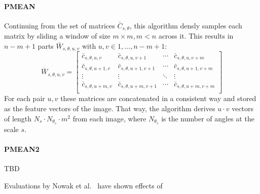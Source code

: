 \paragraph{PMEAN}

Continuing from the set of matrices $\bar{C}_{s, \theta}$, this algorithm
densly samples each matrix by sliding a window of size $m \times m, m < n$
across it. This results in $n - m + 1$ parts $\bar{W}_{s, \theta, u, v}$ with
$u, v \in 1, \dots, n - m + 1$:
\begin{equation*}
    \bar{W}_{s,\theta,u,v} =
    \begin{bmatrix}
        \bar{c}_{s,\theta,u,v} & \bar{c}_{s,\theta,u,v+1} & \cdots & \bar{c}_{s,\theta,u,v+m} \\
        \bar{c}_{s,\theta,u+1,v} & \bar{c}_{s,\theta,u+1,v+1} & \cdots & \bar{c}_{s,\theta,u+1,v+m} \\
        \vdots  & \vdots  & \ddots & \vdots  \\
        \bar{c}_{s,\theta,u+m,v} & \bar{c}_{s,\theta,u+m,v+1} & \cdots & \bar{c}_{s,\theta,u+m,v+m} \\
    \end{bmatrix}
\end{equation*}
For each pair $u, v$ these matrices are concatenated in a consistent way and
stored as the feature vectors of the image. That way, the algorithm derives $u
\cdot v$ vectors of length $N_s \cdot N_{\theta_s} \cdot m^2$ from each image,
where $N_{\theta_s}$ is the number of angles at the scale $s$.

\paragraph{PMEAN2}

TBD

Evaluations by Nowak et al.\ \autocite{nowak_sampling_2006} have shown effects of 
